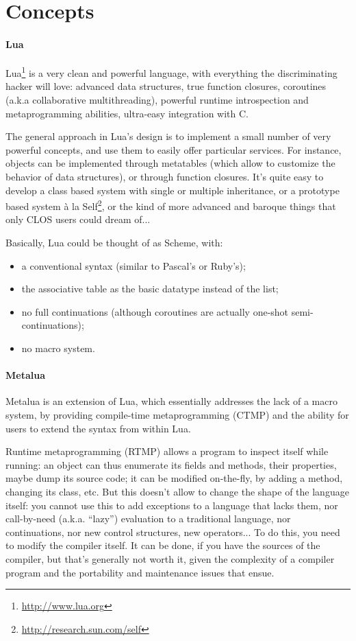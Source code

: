 \section{Concepts}

\paragraph{Lua}
Lua\footnote{\url{http://www.lua.org}} is a very clean and powerful
language, with everything the discriminating hacker will love: advanced
data structures, true function closures, coroutines (a.k.a collaborative
multithreading), powerful runtime introspection and metaprogramming
abilities, ultra-easy integration with C.

The general approach in Lua's design is to implement a small number of
very powerful concepts, and use them to easily offer particular
services. For instance, objects can be implemented through metatables
(which allow to customize the behavior of data structures), or through
function closures. It's quite easy to develop a class based system
with single or multiple inheritance, or a prototype based system 
{\`a la} Self\footnote{\url{http://research.sun.com/self}}, or
the kind of more advanced and baroque things that only CLOS users
could dream of...

Basically, Lua could be thought of as Scheme, with:
\begin{itemize}
\item a conventional syntax (similar to Pascal's or Ruby's);
\item the associative table as the basic datatype instead of the list;
\item no full continuations (although coroutines are actually one-shot
  semi-continuations);
\item no macro system.
\end{itemize}

\paragraph{Metalua}
Metalua is an extension of Lua, which essentially addresses the lack
of a macro system, by providing compile-time metaprogramming (CTMP)
and the ability for users to extend the syntax from within Lua.

Runtime metaprogramming (RTMP) allows a program to inspect itself
while running: an object can thus enumerate its fields and methods,
their properties, maybe dump its source code; it can be modified
on-the-fly, by adding a method, changing its class, etc. But this
doesn't allow to change the shape of the language itself: you cannot
use this to add exceptions to a language that lacks them, nor
call-by-need (a.k.a. ``lazy'') evaluation to a traditional language,
nor continuations, nor new control structures, new operators... To do
this, you need to modify the compiler itself. It can be done, if you
have the sources of the compiler, but that's generally not worth it,
given the complexity of a compiler program and the portability and
maintenance issues that ensue.

